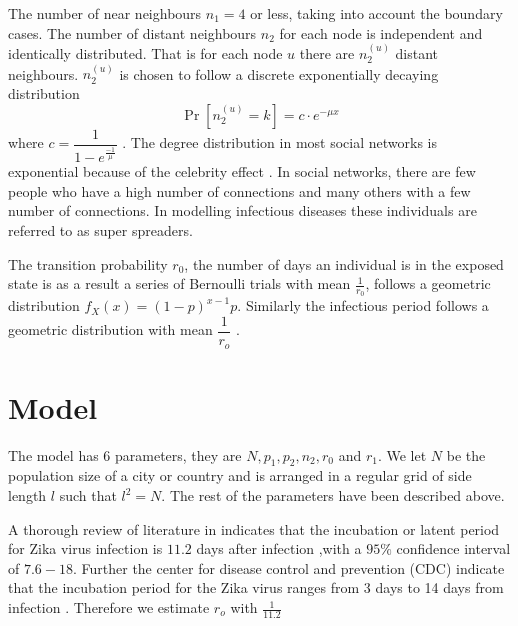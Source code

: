 The number of near neighbours $n_1 = 4$ or less, taking into account the boundary cases.
The number of distant neighbours $n_2$  for each node is independent and  identically distributed. That is for each node $u$ there are $n_2^ {(u)} $ distant neighbours. $n_2^ {(u)} $ is chosen to follow a discrete exponentially decaying distribution 
\begin{equation} 
 \Pr[n_2^{(u)} = k] = c \cdot e^{-\mu x  } \label{5.2.1}
 \end{equation}
 where $c = \dfrac{1}{1- e^{\frac{-1}{\mu}}}$ \citep{fu2013propagation}.
 The degree distribution in most social networks is exponential because of the celebrity effect \citep{estrada2015first}. In social networks, there are few people who have a high number of connections and many others with a few number of connections. In modelling infectious diseases these individuals are referred to as super spreaders.

 The transition probability $r_0$, the number of days an individual is in the exposed state is as a result a series of Bernoulli trials with mean $\frac{1}{r_0}$, follows a geometric distribution $f_X (x) = (1-p) ^ {x-1} p$. Similarly the infectious period follows a geometric distribution with mean $\dfrac{1}{r_o}$ \citep{fu2013propagation}.

\section{Model}
The model has 6 parameters, they are $N, p_1, p_2, n_2, r_0$ and $r_1$. We let $N$ be the population size of a city or country and is arranged in a regular grid of side length $l $ such that $l^2 = N$. The rest of the parameters have been described above.

A thorough review of literature in \cite{lessler2016times} indicates that the incubation or latent period for Zika virus infection is $11.2$ days after infection ,with a $95 \%$ confidence interval of $7.6 -18$. Further the center for disease control and prevention (CDC) indicate that the incubation period for the Zika virus ranges from 3 days to 14 days from infection \citep{krow2017estimated}. Therefore we estimate $r_o$ with $\frac{1}{11.2}$

